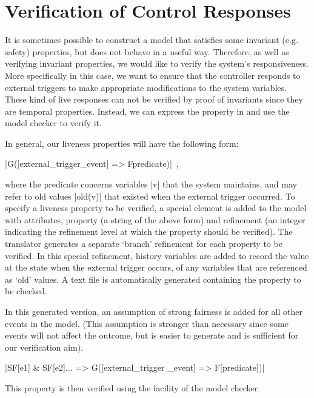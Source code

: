 

\section{Verification of Control Responses}
\label{sec:verificationResponses}

It is sometimes possible to construct a model that satisfies some invariant (e.g. safety) properties, but does not behave in a useful way.
Therefore, as well as verifying invariant properties, we would like to verify the system's responsiveness. 
More specifically in this case, we want to ensure that the controller responds to external triggers to make appropriate modifications to the system variables. 
These kind of live responses can not be verified by proof of invariants since they are temporal properties.
Instead, we can express the property in \LTL  and use the \PROB model checker to verify it.

In general, our liveness properties will have the following form:
\begin{center}
  |G([external_trigger_event] => F{predicate})|~,
\end{center}
where the predicate concerns variables |v| that the system maintains, and may refer to old values |old(v)| that existed when the external trigger occurred.
To specify a liveness property to be verified, a special \LTL element is added to the \SCXML model with attributes, property (a string of the above form)  and refinement (an integer indicating the refinement level at which the property should be verified).
The translator generates a separate `branch' refinement for each \LTL property to be verified. 
In this special refinement, history variables are added to record the value at the state when the external trigger occurs, of any variables that are referenced as `old' values.
A text file is automatically generated containing the \LTL property to be checked. 

In this generated version, an assumption of strong fairness is added for all other events in the model.
(This assumption is stronger than necessary since some events will not affect the outcome, but is easier to generate and is sufficient for our verification aim). 
\begin{center}
  |SF[e1] & SF[e2]... => G([external_trigger _event] => F[predicate])|
\end{center}
This property is then verified using the \LTL facility of the \PROB model checker.

